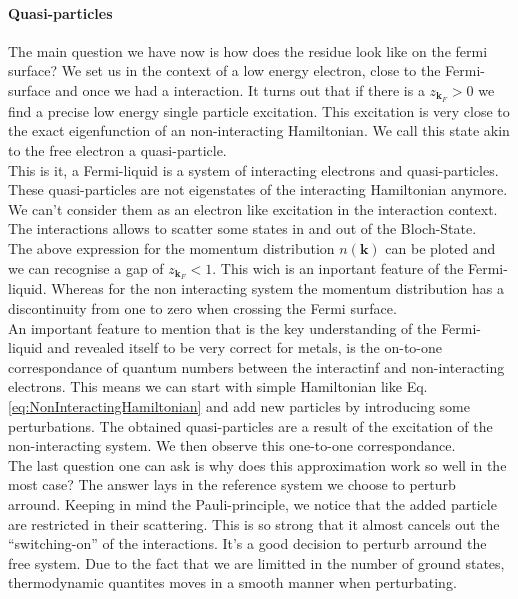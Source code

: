 \documentclass[../main.tex]{subfile}
\begin{document}
\paragraph{Quasi-particles}
The main question we have now is how does the residue look like on the fermi surface? We set us in the context of a low energy electron, close to the Fermi-surface and 
once we had a interaction. It turns out that if there is a $z_{\bm{k}_F}>0$ we find a precise low energy single particle excitation. This excitation is very close
to the exact eigenfunction of an non-interacting Hamiltonian. We call this state akin to the free electron a quasi-particle.\\

This is it, a Fermi-liquid is a system of interacting electrons and quasi-particles. These quasi-particles are not eigenstates of the interacting Hamiltonian anymore.
We can't consider them as an electron like excitation in the interaction context.
The interactions allows to scatter some states in and out of the Bloch-State.\\

The above expression for the momentum distribution $n(\bm{k})$ can be ploted and we can recognise a gap of $z_{\bm{k}_F}<1$. This wich is an inportant feature of
the Fermi-liquid. Whereas for the non interacting
system the momentum distribution has a discontinuity from one to zero when crossing the Fermi surface.\\

An important feature to mention that is the key understanding of the Fermi-liquid and revealed itself to be very correct 
for metals, is the on-to-one correspondance of quantum numbers between the interactinf and non-interacting electrons. 
This means we can start with simple Hamiltonian like Eq. \ref{eq:NonInteractingHamiltonian} and add new particles by introducing
some perturbations. The obtained quasi-particles are a result of the excitation of the non-interacting system. We then observe this
one-to-one correspondance.\\

The last question one can ask is why does this approximation work so well in the most case? The answer lays in the reference system
we choose to perturb arround. Keeping in mind the Pauli-principle, we notice that the added particle are restricted in their scattering.
This is so strong that it almost cancels out the ``switching-on'' of the interactions. It's a good decision to perturb arround
the free system. Due to the fact that we are limitted in the number of ground states, thermodynamic quantites moves in a smooth manner
when perturbating.\\
\end{document}
